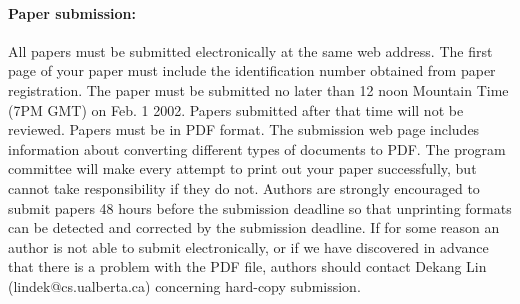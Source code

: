 \documentclass[11pt]{article}
\begin{document}
\paragraph{Paper submission:} All papers must be submitted electronically
at the same web address. The first page of your paper must include the
identification number obtained from paper registration. The paper must
be submitted no later than 12 noon Mountain Time (7PM GMT) on Feb. 1
2002. Papers submitted after that time will not be reviewed. Papers
must be in PDF format. The submission web page includes information
about converting different types of documents to PDF. The program
committee will make every attempt to print out your paper
successfully, but cannot take responsibility if they do not. Authors
are strongly encouraged to submit papers 48 hours before the
submission deadline so that unprinting formats can be detected and
corrected by the submission deadline. If for some reason an author is
not able to submit electronically, or if we have discovered in advance
that there is a problem with the PDF file, authors should contact
Dekang Lin (lindek@cs.ualberta.ca) concerning hard-copy submission.






%
%
\end{document}
